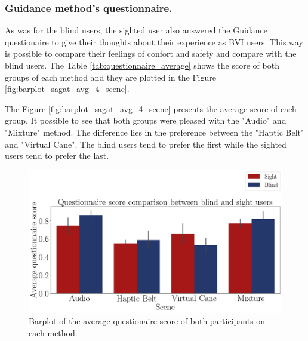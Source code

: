 \subsubsection{Guidance method's questionnaire.}
\label{subsubsec:results_questionnaires_2}

As was for the blind users, the sighted user also answered the Guidance questionaire to give their thoughts about their experience as BVI users. This way is possible to compare their feelings of confort and safety and compare with the blind users. The Table \ref{tab:questionnaire_average} shows the score of both groups of each method and they are plotted in the Figure \ref{fig:barplot_sagat_avg_4_scene}.



 The Figure \ref{fig:barplot_sagat_avg_4_scene} presents the average score of each group. It possible to see that both groups were pleased with the "Audio" and "Mixture" method. The difference lies in the preference between the "Haptic Belt" and "Virtual Cane". The blind users tend to prefer the first while the sighted users tend to prefer the last.

\begin{figure}[!htb]
    \centering
    \includegraphics[width = 0.8\linewidth]{Resultados/Questionario/Figuras/png/barplot_questionnaire_scene.png}
    \caption{Barplot of the  average questionaire score of both participants on each method.}
    \label{fig:barplot_questionnaire_scene}
\end{figure}

